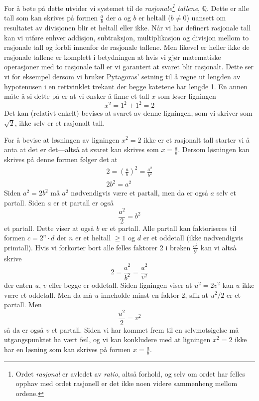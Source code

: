 \documentclass[a4paper,norsk,12pt]{article}
\begin{document}
For å bøte på dette utvider vi systemet til de \emph{rasjonale\footnote{Ordet \emph{rasjonal} er avledet av \emph{ratio}, altså forhold, og selv om ordet har felles opphav med ordet rasjonell er det ikke noen videre sammenheng mellom ordene.} tallene}, $\mathbb{Q}$. Dette er alle tall som kan skrives på formen $\frac{a}{b}$ der $a$ og $b$ er heltall ($b\neq0$) uansett om resultatet av divisjonen blir et heltall eller ikke. Når vi har definert rasjonale tall kan vi utføre enhver addisjon, subtraksjon, multiplikasjon og divisjon mellom to rasjonale tall og forbli innenfor de rasjonale tallene. Men likevel er heller ikke de rasjonale tallene er komplett i betydningen at hvis vi gjør matematiske operasjoner med to rasjonale tall er vi garantert at svaret blir rasjonalt. Dette ser vi for eksempel dersom vi bruker Pytagoras' setning til å regne ut lengden av hypotenusen i en rettvinklet trekant der begge katetene har lengde 1. En annen måte å si dette på er at vi ønsker å finne et tall $x$ som løser ligningen
\begin{displaymath}
	x^2 = 1^2 + 1^2 = 2
\end{displaymath}
Det kan (relativt enkelt) bevises at svaret av denne ligningen, som vi skriver som $\sqrt{2}$, ikke selv er et rasjonalt tall. 

\begin{tproof}
For å bevise at løsningen av ligningen $x^2 = 2$ ikke er et rasjonalt tall starter vi å anta at det er det---altså at svaret kan skrives som $x=\frac{a}{b}$. Dersom løsningen kan skrives på denne formen følger det at
\begin{align*}
	2 = \left(\frac{a}{b}\right)^2 = \frac{a^2}{b^2} \\
	2b^2 = a^2
\end{align*}
Siden $a^2 = 2b^2$ må $a^2$ nødvendigvis være et partall, men da er også $a$ selv et partall. Siden $a$ er et partall er også 
\begin{displaymath}
	\frac{a^2}{2} = b^2
\end{displaymath}
et partall. Dette viser at også $b$ er et partall. Alle partall kan faktoriseres til formen $c=2^n\cdot d$ der $n$ er et heltall $\geq 1$ og $d$ er et oddetall (ikke nødvendigvis primtall). Hvis vi forkorter bort alle felles faktorer 2 i brøken $\frac{a^2}{b^2}$ kan vi altså skrive 
\begin{displaymath}
	2 = \frac{a^2}{b^2} = \frac{u^2}{v^2}
\end{displaymath}
der enten $u$, $v$ eller begge er oddetall. Siden ligningen viser at $u^2 = 2v^2$ kan $u$ ikke være et oddetall. Men da må $u$ inneholde minst en faktor 2, slik at $u^2/2$ er et partall. Men 
\begin{displaymath}
	\frac{u^2}{2} = v^2
\end{displaymath} 
så da er også $v$ et partall. Siden vi har kommet frem til en selvmotsigelse må utgangspunktet ha vært feil, og vi kan konkludere med at ligningen $x^2=2$ ikke har en løsning som kan skrives på formen $x=\frac{a}{b}$. 
\end{tproof}
\end{document}
